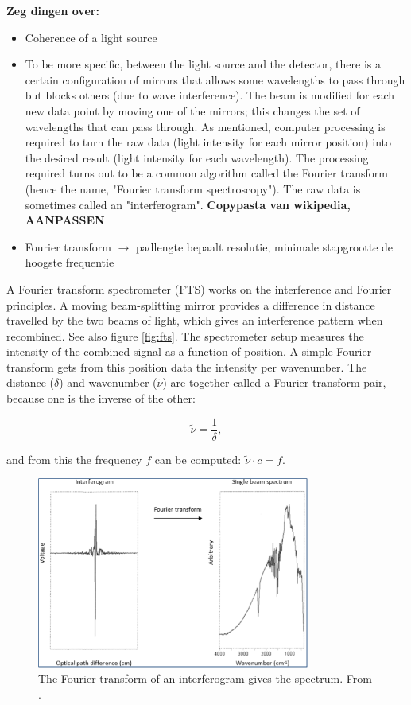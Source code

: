 \textbf{Zeg dingen over:}
\begin{itemize}
 \item Coherence of a light source
 \item To be more specific, between the light source and the detector, there is a certain configuration of mirrors that allows some wavelengths to pass through but blocks others (due to wave interference). The beam is modified for each new data point by moving one of the mirrors; this changes the set of wavelengths that can pass through.
As mentioned, computer processing is required to turn the raw data (light intensity for each mirror position) into the desired result (light intensity for each wavelength). The processing required turns out to be a common algorithm called the Fourier transform (hence the name, "Fourier transform spectroscopy"). The raw data is sometimes called an "interferogram". \textbf{Copypasta van wikipedia, AANPASSEN}
 \item Fourier transform $\rightarrow$ padlengte bepaalt resolutie, minimale stapgrootte de hoogste frequentie
\end{itemize}


A Fourier transform spectrometer (FTS) works on the interference and Fourier principles. A moving beam-splitting mirror provides a difference in distance travelled by the two beams of light, which gives an interference pattern when recombined. See also figure \ref{fig:fts}. The spectrometer setup measures the intensity of the combined signal as a function of position. A simple Fourier transform gets from this position data the intensity per wavenumber. The distance ($\delta$) and wavenumber ($\tilde{\nu}$) are together called a Fourier transform pair, because one is the inverse of the other:

\[
 \tilde{\nu} = \frac{1}{\delta},
\]

and from this the frequency $f$ can be computed: $\tilde{\nu}\cdot c=f$.



\begin{figure}
 \begin{center}
  \includegraphics[width=0.8\textwidth]{figures/randomfouriertransform.png}
  \caption{The Fourier transform of an interferogram gives the spectrum. From \cite{ucdavis}.}
  \label{fig:fouriertransform}
 \end{center}
\end{figure}

